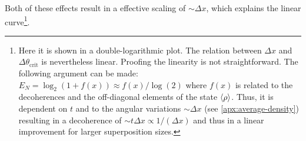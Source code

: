 Both of these effects result in a effective scaling of $\sim \Delta x$, which explains the linear curve\footnote{Here it is shown in a double-logarithmic plot. The relation between $\Delta x$ and $\Delta \theta_\mathrm{crit}$ is nevertheless linear. Proofing the linearity is not straightforward. The following argument can be made: $E_N = \log_2(1 + f(x)) \approx f(x)/\log(2)$ where $f(x)$ is related to the decoherences and the off-diagonal elements of the state $\left\langle\rho\right\rangle$. Thus, it is dependent on $t$ and to the angular variations $\sim \Delta x$ (see \cref{apx:average-density}) resulting in a decoherence of $\sim t \Delta x \propto 1/(\Delta x)$ and thus in a linear improvement for larger superposition sizes.}.



